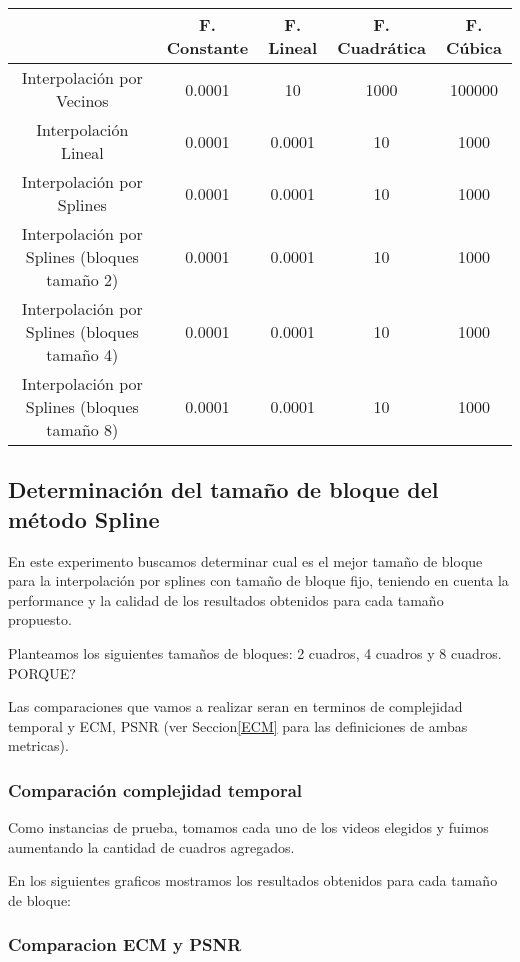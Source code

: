 \begin{table}[H]
    \begin{tabular}{| c | c | c | c | c |}
    \hline
    {} & F. Constante & F. Lineal & F. Cuadrática & F. Cúbica \\ \hline
    Interpolación por Vecinos & 0.0001 & 10 & 1000 & 100000 \\
    Interpolación Lineal & 0.0001 & 0.0001 & 10 & 1000 \\
    Interpolación por Splines & 0.0001 & 0.0001 & 10 & 1000 \\
    Interpolación por Splines (bloques tamaño 2) & 0.0001 & 0.0001 & 10 & 1000 \\
    Interpolación por Splines (bloques tamaño 4) & 0.0001 & 0.0001 & 10 & 1000 \\
    Interpolación por Splines (bloques tamaño 8) & 0.0001 & 0.0001 & 10 & 1000 \\
    \hline
    \end{tabular}
\end{table}

\subsection{Determinación del tamaño de bloque del método Spline}
En este experimento buscamos determinar cual es el mejor tamaño de bloque para la
 interpolación por splines con tamaño de bloque fijo, teniendo en cuenta la
  performance y la calidad de los resultados obtenidos para cada tamaño propuesto.

Planteamos los siguientes tamaños de bloques: 2 cuadros, 4 cuadros y 8 cuadros. PORQUE?

Las comparaciones que vamos a realizar seran en terminos de complejidad temporal y ECM, PSNR (ver Seccion\ref{ECM} para las definiciones de ambas metricas).
\subsubsection{Comparación complejidad temporal}
Como instancias de prueba, tomamos cada uno de los videos elegidos y fuimos aumentando la cantidad de cuadros agregados.

En los siguientes graficos mostramos los resultados obtenidos para cada tamaño de bloque:

\subsubsection{Comparacion ECM y PSNR}


